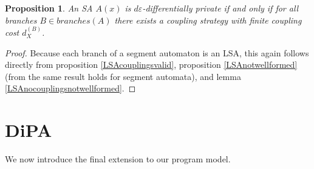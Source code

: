 \documentclass[12pt]{article}
\newtheorem{prop}[thm]{Proposition}
\theoremstyle{definition}
\begin{document}
\begin{prop}
    An SA $A(x)$ is $d\varepsilon$-differentially private if and only if for all branches $B\in branches(A)$ there exists a coupling strategy with finite coupling cost $d_X^{(B)}$.
\end{prop}

\begin{proof}
    Because each branch of a segment automaton is an LSA, this again follows directly from proposition \ref{LSAcouplingsvalid}, proposition \ref{LSAnotwellformed} (from \cite{chadhaLinearTimeDecidability2021} the same result holds for segment automata), and lemma \ref{LSAnocouplingsnotwellformed}.
\end{proof}

\section{DiPA}

We now introduce the final extension to our program model. 
\end{document}
